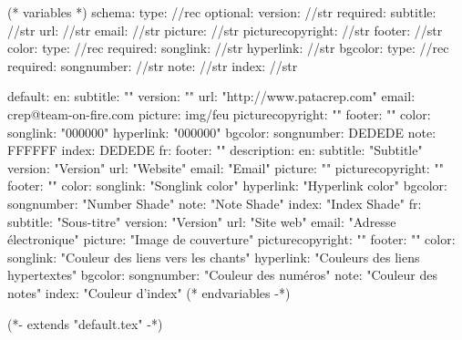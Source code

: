 
(* variables *)
schema:
  type: //rec
  optional:
    version: //str
  required:
    subtitle: //str
    url: //str
    email: //str
    picture: //str
    picturecopyright: //str
    footer: //str
    color:
      type: //rec
      required:
        songlink: //str
        hyperlink: //str
    bgcolor:
      type: //rec
      required:
        songnumber: //str
        note: //str
        index: //str

default:
  en:
    subtitle: ""
    version: ""
    url: "http://www.patacrep.com"
    email: crep@team-on-fire.com
    picture: img/feu
    picturecopyright: ""
    footer: ""
    color:
      songlink: "000000"
      hyperlink: "000000"
    bgcolor:
      songnumber: DEDEDE
      note: FFFFFF
      index: DEDEDE
  fr:
    footer: ""
description:
  en:
    subtitle: "Subtitle"
    version: "Version"
    url: "Website"
    email: "Email"
    picture: ""
    picturecopyright: ""
    footer: ""
    color:
      songlink: "Songlink color"
      hyperlink: "Hyperlink color"
    bgcolor:
      songnumber: "Number Shade"
      note: "Note Shade"
      index: "Index Shade"
  fr:
    subtitle: "Sous-titre"
    version: "Version"
    url: "Site web"
    email: "Adresse électronique"
    picture: "Image de couverture"
    picturecopyright: ""
    footer: ""
    color:
      songlink: "Couleur des liens vers les chants"
      hyperlink: "Couleurs des liens hypertextes"
    bgcolor:
      songnumber: "Couleur des numéros"
      note: "Couleur des notes"
      index: "Couleur d'index"
(* endvariables -*)

(*- extends "default.tex" -*)

